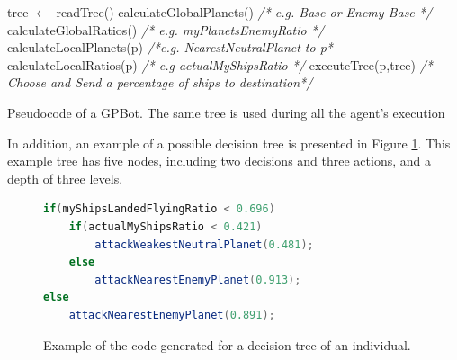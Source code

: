 \documentclass[conference]{IEEEtran}
\begin{document}
\begin{algorithm}[htb]
\begin{algorithmic}

\STATE tree $\leftarrow$ readTree()
  \STATE calculateGlobalPlanets() {\em /* e.g. Base or Enemy Base */}
  \STATE calculateGlobalRatios()  {\em /* e.g. myPlanetsEnemyRatio */}
    \STATE calculateLocalPlanets(p) {\em /*e.g. NearestNeutralPlanet to p*}
    \STATE calculateLocalRatios(p)  {\em /* e.g actualMyShipsRatio */}
    \STATE executeTree(p,tree)  {\em /* Choose and Send a percentage of ships to destination*/}
   \ENDFOR
\ENDWHILE

\end{algorithmic}
\caption{Pseudocode of a GPBot. The same tree is used during all the agent's execution}
\label{algoturn}
\end{algorithm}


In addition, an example of a possible decision tree is presented in Figure \ref{fig:javatree}. This example tree has five nodes, including two decisions and three actions, and a depth of three levels.

\begin{figure}[htb]

\begin{lstlisting}[frame=single,language=Java,tabsize=4]
if(myShipsLandedFlyingRatio < 0.696)
	if(actualMyShipsRatio < 0.421)
		attackWeakestNeutralPlanet(0.481);
	else
		attackNearestEnemyPlanet(0.913);
else
	attackNearestEnemyPlanet(0.891);
\end{lstlisting}

%
%
\caption{Example of the code generated for a decision tree of an individual.}
\label{fig:javatree}
\end{figure}
\end{document}
